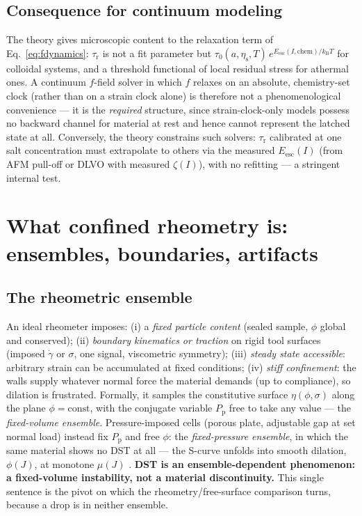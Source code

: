 \documentclass[11pt]{article}
\newcommand{\etas}{\eta_{\mathrm{s}}}
\newcommand{\gdot}{\dot{\gamma}}
\begin{document}
\subsection{Consequence for continuum modeling}
The theory gives microscopic content to the relaxation term of Eq.~\eqref{eq:fdynamics}: $\tau_{\mathrm{r}}$ is not a fit parameter but $\tau_{0}(a,\etas,T)\,e^{E_{\mathrm{esc}}(I,\mathrm{chem})/k_{\mathrm{B}}T}$ for colloidal systems, and a threshold functional of local residual stress for athermal ones. A continuum $f$-field solver in which $f$ relaxes on an absolute, chemistry-set clock (rather than on a strain clock alone) is therefore not a phenomenological convenience --- it is the \emph{required} structure, since strain-clock-only models possess no backward channel for material at rest and hence cannot represent the latched state at all. Conversely, the theory constrains such solvers: $\tau_{\mathrm{r}}$ calibrated at one salt concentration must extrapolate to others via the measured $E_{\mathrm{esc}}(I)$ (from AFM pull-off or DLVO with measured $\zeta(I)$), with no refitting --- a stringent internal test.

\section{What confined rheometry is: ensembles, boundaries, artifacts}
\label{sec:rheometry}

\subsection{The rheometric ensemble}
An ideal rheometer imposes: (i) a \emph{fixed particle content} (sealed sample, $\phi$ global and conserved); (ii) \emph{boundary kinematics or traction} on rigid tool surfaces (imposed $\gdot$ or $\sigma$, one signal, viscometric symmetry); (iii) \emph{steady state accessible}: arbitrary strain can be accumulated at fixed conditions; (iv) \emph{stiff confinement}: the walls supply whatever normal force the material demands (up to compliance), so dilation is frustrated. Formally, it samples the constitutive surface $\eta(\phi,\sigma)$ along the plane $\phi = \mathrm{const}$, with the conjugate variable $P_{\mathrm{p}}$ free to take any value --- the \emph{fixed-volume ensemble}. Pressure-imposed cells (porous plate, adjustable gap at set normal load) instead fix $P_{\mathrm{p}}$ and free $\phi$: the \emph{fixed-pressure ensemble}, in which the same material shows no DST at all --- the S-curve unfolds into smooth dilation, $\phi(J)$, at monotone $\mu(J)$ \cite{boyer2011}. \textbf{DST is an ensemble-dependent phenomenon: a fixed-volume instability, not a material discontinuity.} This single sentence is the pivot on which the rheometry/free-surface comparison turns, because a drop is in neither ensemble.
\end{document}
